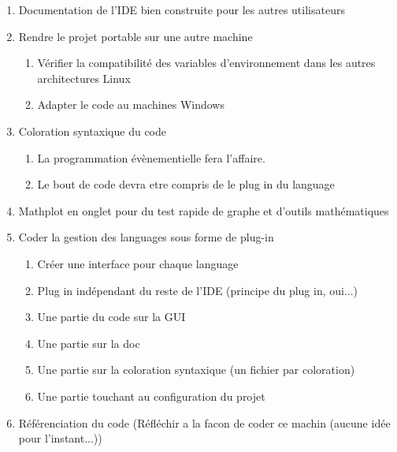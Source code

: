 \documentclass[a4paper,12pt]{article}
\begin{document}
\begin{enumerate}
\item Documentation de l'IDE bien construite pour les autres utilisateurs
\item Rendre le projet portable sur une autre machine

\begin{enumerate}
\item Vérifier la compatibilité des variables d'environnement dans les autres architectures Linux
\item Adapter le code au machines Windows
\end{enumerate}

\item Coloration syntaxique du code

\begin{enumerate}
\item La programmation évènementielle fera l'affaire. 
\item Le bout de code devra etre compris de le plug in du language
\end{enumerate}

\item Mathplot en onglet pour du test rapide de graphe et d'outils mathématiques 
\item Coder la gestion des languages sous forme de plug-in

\begin{enumerate}
\item Créer une interface pour chaque language
\item Plug in indépendant du reste de l'IDE (principe du plug in, oui...)
\item Une partie du code sur la GUI
\item Une partie sur la doc
\item Une partie sur la coloration syntaxique (un fichier par coloration)
\item Une partie touchant au configuration du projet
\end{enumerate}

\item Référenciation du code (Réfléchir a la facon de coder ce machin (aucune idée pour l'instant...))

\end{enumerate}
\end{document}
